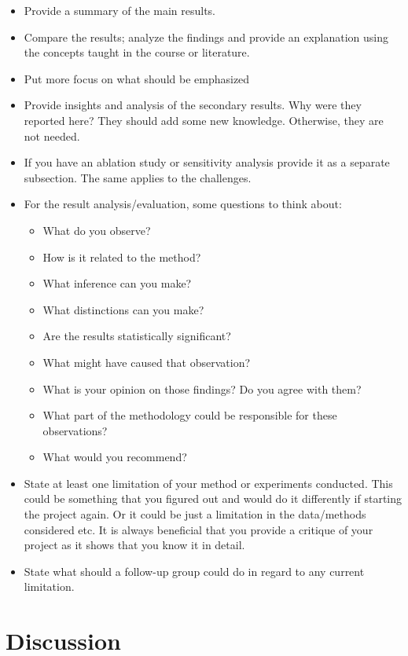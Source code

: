 \documentclass{article}
\begin{document}
\begin{itemize}
    \item Provide a summary of the main results.
    \item Compare the results; analyze the findings and provide an explanation using the concepts taught in the course or literature.
    \item Put more focus on what should be emphasized
    \item Provide insights and analysis of the secondary results. Why were they reported here? They should add some new knowledge. Otherwise, they are not needed.    
    \item If you have an ablation study or sensitivity analysis provide it as a separate subsection. The same applies to the challenges.

   \item For the result analysis/evaluation, some questions to think about:
    \begin{itemize}
        \item What do you observe?
        \item How is it related to the method?
        \item What inference can you make?
        \item What distinctions can you make?
        \item Are the results statistically significant?
        \item What might have caused that observation?
        \item What is your opinion on those findings? Do you agree with them?
        \item What part of the methodology could be responsible for these observations?
        \item What would you recommend?
    \end{itemize}
    
    \item State at least one limitation of your method or experiments conducted. This could be something that you figured out and would do it differently if starting the project again. Or it could be just a limitation in the data/methods considered etc. It is always beneficial that you provide a critique of your project as it shows that you know it in detail.
    \item State what should a follow-up group could do in regard to any current limitation.
\end{itemize}


\section{Discussion}
\end{document}
